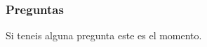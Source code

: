 \begin{frame}
  \frametitle{Preguntas}
  Si teneis alguna pregunta este es el momento.
  \end{frame}
